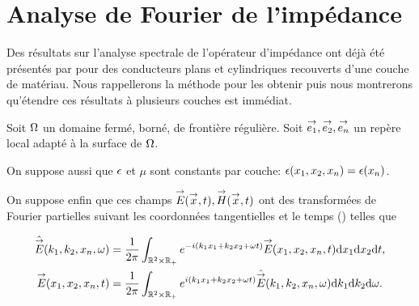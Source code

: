 \section{Analyse de Fourier de l'impédance}

Des résultats sur l'analyse spectrale de l'opérateur d'impédance ont déjà été présentés par \cite{hoppe_impedance_1995} pour des conducteurs plans et cylindriques recouverts d'une couche de matériau.
Nous rappellerons la méthode pour les obtenir puis nous montrerons qu’étendre ces résultats à plusieurs couches est immédiat. 

Soit \(\Omega\) un domaine fermé, borné, de frontière régulière. Soit \({\overset{\rightarrow}{e_1}},{\overset{\rightarrow}{e_2}},{\overset{\rightarrow}{e_n}}\) un repère local adapté à la surface de \(\Omega\).


On suppose aussi que \(\epsilon\) et \(\mu\) sont constants par couche: \(\epsilon(x_1,x_2,x_n)=\epsilon(x_n)\).

On suppose enfin que ces champs \({\overset{\rightarrow}{E}}({\overset{\rightarrow}{x}},t),{\overset{\rightarrow}{H}}({\overset{\rightarrow}{x}},t)\) ont des transformées de Fourier partielles suivant les coordonnées tangentielles et le temps
(\cite[Théorème de Plancherel, p.~153]{yosida_functional_1995})
telles que

\begin{align*}
    \hat{{\overset{\rightarrow}{E}}} (k_1,k_2,x_n,\omega) &= \dfrac{1}{2\pi}\int_{\mathbb R^2\times\mathbb R_+} e^{-i(k_1x_1+k_2x_2+\omega t)}{\overset{\rightarrow}{E}}(x_1,x_2,x_n,t) \mathrm{d}{x_1}\mathrm{d}{x_2}\mathrm{d}{t},
    \\
    {\overset{\rightarrow}{E}}(x_1,x_2,x_n,t) &= \dfrac{1}{2\pi}\int_{\mathbb R^2\times\mathbb R_+} e^{i(k_1x_1+k_2x_2+\omega t)}\hat{{\overset{\rightarrow}{E}}} (k_1,k_2,x_n,\omega) \mathrm{d}{k_1}\mathrm{d}{k_2} \mathrm{d}{\omega}.
\end{align*}

